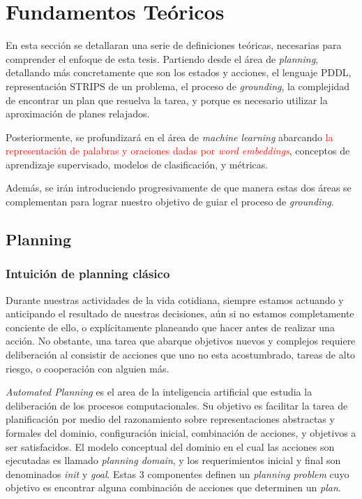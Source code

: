 \chapter{Fundamentos Teóricos}
\label{ch:lit_rev}

En esta sección se detallaran una serie de definiciones teóricas, necesarias
para comprender el enfoque de esta tesis. Partiendo desde el área de
\emph{planning}, detallando más concretamente que son los estados y acciones, el
lenguaje PDDL, representación STRIPS de un problema, el proceso de
\emph{grounding}, la complejidad de encontrar un plan que resuelva la tarea, y
porque es necesario utilizar la aproximación de planes relajados.

Posteriormente, se profundizará en el área de \emph{machine learning} abarcando
\textcolor{red}{la representación de palabras y oraciones dadas por \emph{word
embeddings}}, conceptos de aprendizaje supervisado, modelos de clasificación, y
métricas.

Además, se irán introduciendo progresivamente de que manera estas dos áreas
se complementan para lograr nuestro objetivo de guiar el proceso de
\emph{grounding}.

\section{Planning}

\subsection{Intuición de planning clásico}

Durante nuestras actividades de la vida cotidiana, siempre estamos actuando y
anticipando el resultado de nuestras decisiones, aún si no estamos completamente
conciente de ello, o explícitamente planeando que hacer antes de realizar una
acción. No obstante, una tarea que abarque objetivos nuevos y complejos requiere
deliberación al consistir de acciones que uno no esta acostumbrado, tareas de
alto riesgo, o cooperación con alguien más.
\citep{Nau-Ghallab-Malik-Traverso-2004}

\emph{Automated Planning} es el area de la inteligencia artificial que estudia
la deliberación de los procesos computacionales. Su objetivo es facilitar la
tarea de planificación por medio del razonamiento sobre representaciones
abstractas y formales del dominio, configuración inicial, combinación de
acciones, y objetivos a ser satisfacidos. El modelo conceptual del dominio en el
cual las acciones son ejecutadas es llamado \emph{planning domain}, y los
requerimientos inicial y final son denominados \emph{init} y \emph{goal}. Estas
3 componentes definen un \emph{planning problem} cuyo objetivo es encontrar
alguna combinación de acciones que determinen un \emph{plan}.


